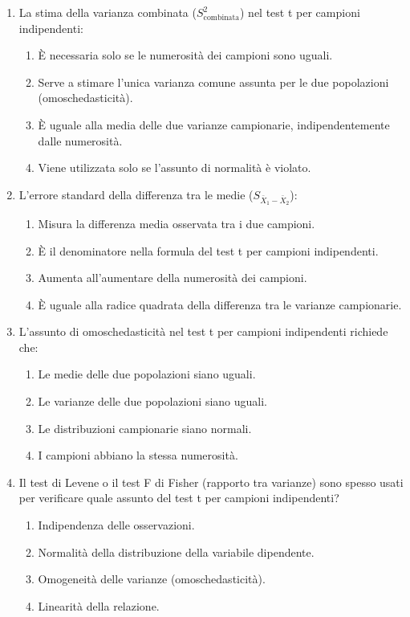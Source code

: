 \documentclass[12pt, a4paper]{article}
\newcommand{\samplemean}{\bar{X}} %
\newcommand{\Spool}{S^2_{\text{combinata}}} %
\begin{document}
\begin{enumerate}
    \item La stima della varianza combinata ($\Spool$) nel test t per campioni indipendenti:
    \begin{enumerate}
        \item È necessaria solo se le numerosità dei campioni sono uguali.
        \item Serve a stimare l'unica varianza comune assunta per le due popolazioni (omoschedasticità).
        \item È uguale alla media delle due varianze campionarie, indipendentemente dalle numerosità.
        \item Viene utilizzata solo se l'assunto di normalità è violato.
    \end{enumerate}

    \item L'errore standard della differenza tra le medie ($S_{\samplemean_1 - \samplemean_2}$):
    \begin{enumerate}
        \item Misura la differenza media osservata tra i due campioni.
        \item È il denominatore nella formula del test t per campioni indipendenti.
        \item Aumenta all'aumentare della numerosità dei campioni.
        \item È uguale alla radice quadrata della differenza tra le varianze campionarie.
    \end{enumerate}

    \item L'assunto di omoschedasticità nel test t per campioni indipendenti richiede che:
    \begin{enumerate}
        \item Le medie delle due popolazioni siano uguali.
        \item Le varianze delle due popolazioni siano uguali.
        \item Le distribuzioni campionarie siano normali.
        \item I campioni abbiano la stessa numerosità.
    \end{enumerate}

    \item Il test di Levene o il test F di Fisher (rapporto tra varianze) sono spesso usati per verificare quale assunto del test t per campioni indipendenti?
    \begin{enumerate}
        \item Indipendenza delle osservazioni.
        \item Normalità della distribuzione della variabile dipendente.
        \item Omogeneità delle varianze (omoschedasticità).
        \item Linearità della relazione.
    \end{enumerate}


\end{enumerate}
\end{document}
